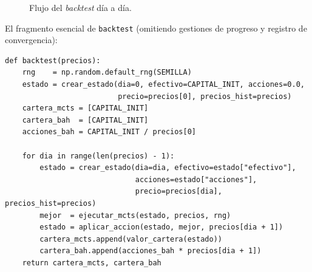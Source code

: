 \begin{figure}[H]
\centering
{}
\caption{Flujo del \emph{backtest} día a día.}
\label{fig:flujo-backtest}
\end{figure}

El fragmento esencial de \texttt{backtest} (omitiendo gestiones de progreso y registro de convergencia):

\begin{lstlisting}[caption={Bucle principal del \emph{backtest}.}, label={lst:backtest}]
def backtest(precios):
    rng    = np.random.default_rng(SEMILLA)
    estado = crear_estado(dia=0, efectivo=CAPITAL_INIT, acciones=0.0,
                          precio=precios[0], precios_hist=precios)
    cartera_mcts = [CAPITAL_INIT]
    cartera_bah  = [CAPITAL_INIT]
    acciones_bah = CAPITAL_INIT / precios[0]

    for dia in range(len(precios) - 1):
        estado = crear_estado(dia=dia, efectivo=estado["efectivo"],
                              acciones=estado["acciones"],
                              precio=precios[dia], precios_hist=precios)
        mejor  = ejecutar_mcts(estado, precios, rng)
        estado = aplicar_accion(estado, mejor, precios[dia + 1])
        cartera_mcts.append(valor_cartera(estado))
        cartera_bah.append(acciones_bah * precios[dia + 1])
    return cartera_mcts, cartera_bah
\end{lstlisting}

